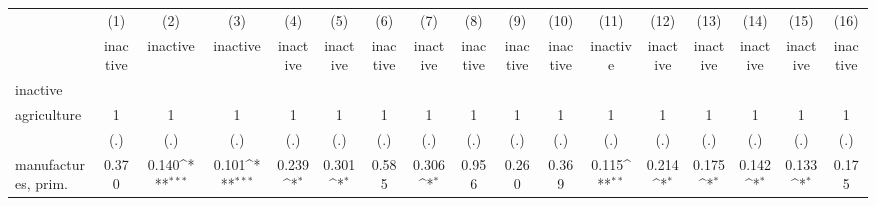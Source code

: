 {
\def\sym#1{\ifmmode^{#1}\else\(^{#1}\)\fi}
\begin{tabular}{l*{16}{c}}
\hline\hline
                    &\multicolumn{1}{c}{(1)}&\multicolumn{1}{c}{(2)}&\multicolumn{1}{c}{(3)}&\multicolumn{1}{c}{(4)}&\multicolumn{1}{c}{(5)}&\multicolumn{1}{c}{(6)}&\multicolumn{1}{c}{(7)}&\multicolumn{1}{c}{(8)}&\multicolumn{1}{c}{(9)}&\multicolumn{1}{c}{(10)}&\multicolumn{1}{c}{(11)}&\multicolumn{1}{c}{(12)}&\multicolumn{1}{c}{(13)}&\multicolumn{1}{c}{(14)}&\multicolumn{1}{c}{(15)}&\multicolumn{1}{c}{(16)}\\
                    &\multicolumn{1}{c}{inactive}&\multicolumn{1}{c}{inactive}&\multicolumn{1}{c}{inactive}&\multicolumn{1}{c}{inactive}&\multicolumn{1}{c}{inactive}&\multicolumn{1}{c}{inactive}&\multicolumn{1}{c}{inactive}&\multicolumn{1}{c}{inactive}&\multicolumn{1}{c}{inactive}&\multicolumn{1}{c}{inactive}&\multicolumn{1}{c}{inactive}&\multicolumn{1}{c}{inactive}&\multicolumn{1}{c}{inactive}&\multicolumn{1}{c}{inactive}&\multicolumn{1}{c}{inactive}&\multicolumn{1}{c}{inactive}\\
\hline
inactive            &                     &                     &                     &                     &                     &                     &                     &                     &                     &                     &                     &                     &                     &                     &                     &                     \\
agriculture         &           1         &           1         &           1         &           1         &           1         &           1         &           1         &           1         &           1         &           1         &           1         &           1         &           1         &           1         &           1         &           1         \\
                    &         (.)         &         (.)         &         (.)         &         (.)         &         (.)         &         (.)         &         (.)         &         (.)         &         (.)         &         (.)         &         (.)         &         (.)         &         (.)         &         (.)         &         (.)         &         (.)         \\
[1em]
manufactures, prim. &       0.370         &       0.140\sym{***}&       0.101\sym{***}&       0.239\sym{*}  &       0.301\sym{*}  &       0.585         &       0.306\sym{*}  &       0.956         &       0.260         &       0.369         &       0.115\sym{**} &       0.214\sym{*}  &       0.175\sym{*}  &       0.142\sym{*}  &       0.133\sym{*}  &       0.175         \\

\end{tabular}}
